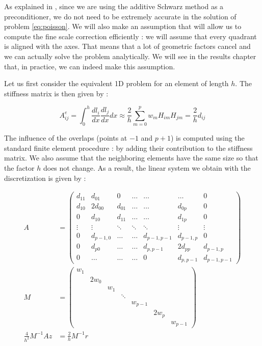 As explained in \cite{over_acc}, since we are using the additive Schwarz method as a preconditioner, we do not need to be extremely accurate in the solution of problem \ref{eq:poisson}. We will also make an assumption that will allow us to compute the fine scale correction efficiently : we will assume that every quadrant is aligned with the axes. That means that a lot of geometric factors cancel and we can actually solve the problem analytically. We will see in the results chapter that, in practice, we can indeed make this assumption.

Let us first consider the equivalent 1D problem for an element of length $h$. The stiffness matrix is then given by : 

$$A^e_{ij} = \int_0^h  \frac{dl_i}{dx}\frac{dl_j}{dx} dx \approx \frac{2}{h} \sum_{m=0}^p w_mH_{im}H_{jm} = \frac{2}{h} d_{ij}$$

The influence of the overlaps (points at $-1$ and $p+1$) is computed using the standard finite element procedure : by adding their contribution to the stiffness matrix. We also assume that the neighboring elements have the same size so that the factor $h$ does not change. As a result, the linear system we obtain with the discretization is given by : 

\begin{align*}
A&= \begin{pmatrix}
d_{11} & d_{01} & 0 & \hdots & \hdots &\hdots & 0\\
d_{10} & 2d_{00} & d_{01} & \hdots & \hdots & d_{0p} & 0 \\
0 & d_{10} & d_{11} & \hdots & \hdots & d_{1p} & 0\\
\vdots & \vdots & \ddots & \ddots & \ddots & \vdots &\vdots \\
0 & d_{p-1,0} & \hdots & \hdots & d_{p-1,p-1} & d_{p-1,p} & 0\\
0 & d_{p0} & \hdots & \hdots & d_{p,p-1} & 2d_{pp} & d_{p-1,p}\\
0 & \hdots & \hdots & \hdots & 0 & d_{p,p-1} & d_{p-1,p-1}
\end{pmatrix}\\
M &= \begin{pmatrix}
w_1 & & & & & & \\
& 2w_0 & & & & & \\
& & w_1 & & & & \\
& & & \ddots & & &\\
& & & & w_{p-1} & &\\
& & & & & 2w_p & \\
& & & & & & w_{p-1}
\end{pmatrix}\\
\frac{4}{h^2}M^{-1}A z &= \frac{2}{h}M^{-1}r
\end{align*}

